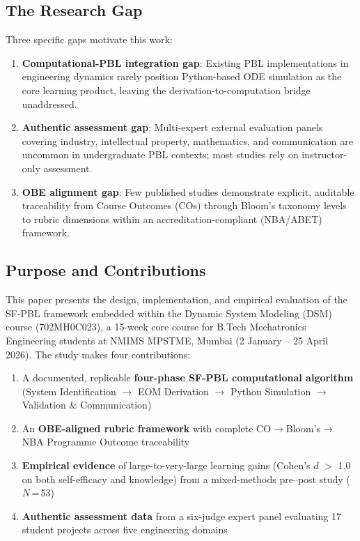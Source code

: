 \documentclass[12pt, a4paper]{article}
\begin{document}
\subsection{The Research Gap}

Three specific gaps motivate this work:

\begin{enumerate}
  \item \textbf{Computational-PBL integration gap}: Existing PBL
    implementations in engineering dynamics rarely position
    Python-based ODE simulation as the core learning product,
    leaving the derivation-to-computation bridge unaddressed.

  \item \textbf{Authentic assessment gap}: Multi-expert external
    evaluation panels covering industry, intellectual property,
    mathematics, and communication are uncommon in undergraduate
    PBL contexts; most studies rely on instructor-only assessment.

  \item \textbf{OBE alignment gap}: Few published studies
    demonstrate explicit, auditable traceability from Course
    Outcomes (COs) through Bloom's taxonomy levels to rubric
    dimensions within an accreditation-compliant (NBA/ABET)
    framework.
\end{enumerate}

\subsection{Purpose and Contributions}

This paper presents the design, implementation, and empirical
evaluation of the SF-PBL framework embedded within the Dynamic
System Modeling (DSM) course (702MH0C023), a 15-week core course
for B.Tech Mechatronics Engineering students at NMIMS MPSTME,
Mumbai (2 January -- 25 April 2026). The study makes four
contributions:

\begin{enumerate}
  \item A documented, replicable \textbf{four-phase SF-PBL
    computational algorithm} (System Identification
    $\rightarrow$ EOM Derivation $\rightarrow$ Python Simulation
    $\rightarrow$ Validation \& Communication)

  \item An \textbf{OBE-aligned rubric framework} with complete
    CO$\rightarrow$Bloom's$\rightarrow$NBA Programme Outcome
    traceability

  \item \textbf{Empirical evidence} of large-to-very-large
    learning gains (Cohen's $d$ $>$ 1.0 on both self-efficacy
    and knowledge) from a mixed-methods pre--post study
    ($N$\,=\,53)

  \item \textbf{Authentic assessment data} from a six-judge
    expert panel evaluating 17 student projects across five
    engineering domains
\end{enumerate}
\end{document}
